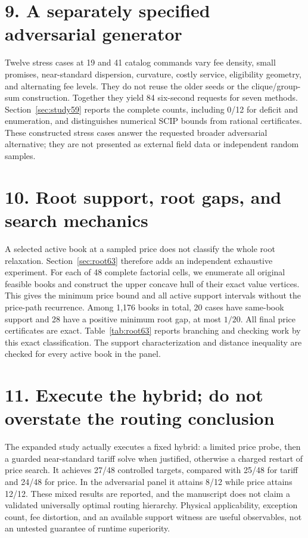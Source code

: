 \section*{9. A separately specified adversarial generator}
Twelve stress cases at 19 and 41 catalog commands vary fee density, small promises, near-standard dispersion, curvature, costly service, eligibility geometry, and alternating fee levels. They do not reuse the older seeds or the clique/group-sum construction. Together they yield 84 six-second requests for seven methods. Section~\ref{sec:study59} reports the complete counts, including 0/12 for deficit and enumeration, and distinguishes numerical SCIP bounds from rational certificates. These constructed stress cases answer the requested broader adversarial alternative; they are not presented as external field data or independent random samples.

\section*{10. Root support, root gaps, and search mechanics}
A selected active book at a sampled price does not classify the whole root relaxation. Section~\ref{sec:root63} therefore adds an independent exhaustive experiment. For each of 48 complete factorial cells, we enumerate all original feasible books and construct the upper concave hull of their exact value vertices. This gives the minimum price bound and all active support intervals without the price-path recurrence. Among 1,176 books in total, 20 cases have same-book support and 28 have a positive minimum root gap, at most $1/20$. All final price certificates are exact. Table~\ref{tab:root63} reports branching and checking work by this exact classification. The support characterization and distance inequality are checked for every active book in the panel.

\section*{11. Execute the hybrid; do not overstate the routing conclusion}
The expanded study actually executes a fixed hybrid: a limited price probe, then a guarded near-standard tariff solve when justified, otherwise a charged restart of price search. It achieves 27/48 controlled targets, compared with 25/48 for tariff and 24/48 for price. In the adversarial panel it attains 8/12 while price attains 12/12. These mixed results are reported, and the manuscript does not claim a validated universally optimal routing hierarchy. Physical applicability, exception count, fee distortion, and an available support witness are useful observables, not an untested guarantee of runtime superiority.


